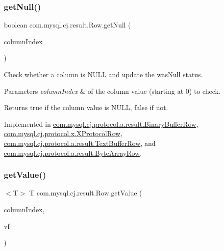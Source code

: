 \subsubsection{\texorpdfstring{get\+Null()}{getNull()}}
{\footnotesize\ttfamily boolean com.\+mysql.\+cj.\+result.\+Row.\+get\+Null (\begin{DoxyParamCaption}\item[{int}]{column\+Index }\end{DoxyParamCaption})}

Check whether a column is N\+U\+LL and update the \textquotesingle{}was\+Null\textquotesingle{} status.


\begin{DoxyParams}{Parameters}
{\em column\+Index} & of the column value (starting at 0) to check.\\
\hline
\end{DoxyParams}
\begin{DoxyReturn}{Returns}
true if the column value is N\+U\+LL, false if not. 
\end{DoxyReturn}


Implemented in \mbox{\hyperlink{classcom_1_1mysql_1_1cj_1_1protocol_1_1a_1_1result_1_1_binary_buffer_row_af16fb029bdd91774e95d8ee502a85e07}{com.\+mysql.\+cj.\+protocol.\+a.\+result.\+Binary\+Buffer\+Row}}, \mbox{\hyperlink{classcom_1_1mysql_1_1cj_1_1protocol_1_1x_1_1_x_protocol_row_adeaa06e6fee80085ce70902ed77ce16a}{com.\+mysql.\+cj.\+protocol.\+x.\+X\+Protocol\+Row}}, \mbox{\hyperlink{classcom_1_1mysql_1_1cj_1_1protocol_1_1a_1_1result_1_1_text_buffer_row_a7539d7bd87e15e6e315e67f7cc535aa6}{com.\+mysql.\+cj.\+protocol.\+a.\+result.\+Text\+Buffer\+Row}}, and \mbox{\hyperlink{classcom_1_1mysql_1_1cj_1_1protocol_1_1a_1_1result_1_1_byte_array_row_a53f7e5fef1221819ac7c48db6dc9ce94}{com.\+mysql.\+cj.\+protocol.\+a.\+result.\+Byte\+Array\+Row}}.

\mbox{\label{interfacecom_1_1mysql_1_1cj_1_1result_1_1_row_adb3bafc1a031d4ea40a2123f6cc42aba}} 
\subsubsection{\texorpdfstring{get\+Value()}{getValue()}}
{\footnotesize\ttfamily $<$T$>$ T com.\+mysql.\+cj.\+result.\+Row.\+get\+Value (\begin{DoxyParamCaption}\item[{int}]{column\+Index,  }\item[{\mbox{\hyperlink{interfacecom_1_1mysql_1_1cj_1_1result_1_1_value_factory}{Value\+Factory}}$<$ T $>$}]{vf }\end{DoxyParamCaption})}

